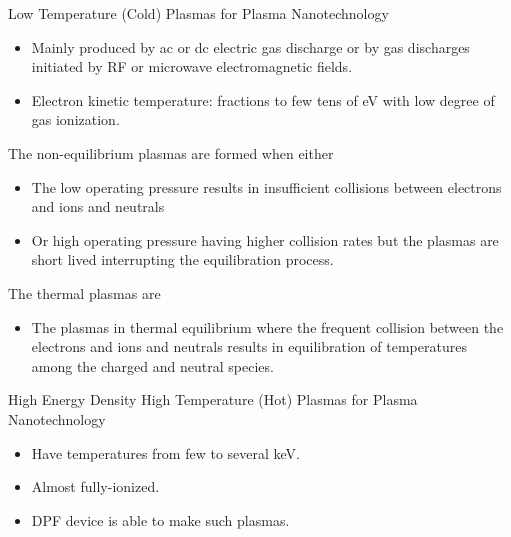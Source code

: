\begin{frame} {Low Temperature (Cold) Plasmas for Plasma Nanotechnology}
    \begin{itemize}
        \item Mainly produced by ac or dc electric gas discharge or by gas discharges initiated by RF or microwave electromagnetic fields.
        \item Electron kinetic temperature: fractions to few tens of eV with low degree of gas ionization.
    \end{itemize}

    The non-equilibrium plasmas are formed when either
    \begin{itemize}
        \item The low operating pressure results in insufficient collisions between electrons and ions and neutrals
        \item Or high operating pressure having higher collision rates but the plasmas are short lived interrupting the equilibration process.
    \end{itemize}

    The thermal plasmas are
    \begin{itemize}
        \item The plasmas in thermal equilibrium
              where the frequent collision between the electrons and ions and neutrals results in equilibration of temperatures among the charged and neutral species.
    \end{itemize}
\end{frame}

\begin{frame} {High Energy Density High Temperature (Hot) Plasmas for Plasma Nanotechnology}
    \begin{itemize}
        \item Have temperatures from few to several keV.
        \item Almost fully-ionized.
        \item DPF device is able to make such plasmas.
    \end{itemize}
\end{frame}

